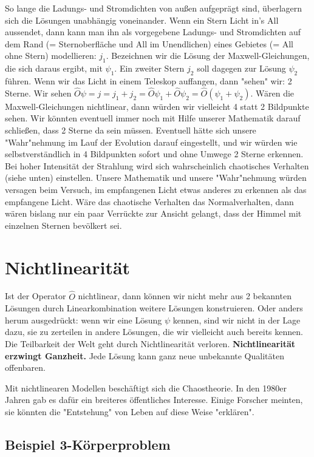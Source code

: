 \documentclass[12pt]{book}
\begin{document}
So lange die Ladungs- und Stromdichten von außen aufgeprägt sind, überlagern sich die Lösungen unabhängig voneinander. Wenn ein Stern Licht in's All aussendet, dann kann man ihn als vorgegebene Ladungs- und Stromdichten auf dem Rand (= Sternoberfläche und All im Unendlichen) eines Gebietes (= All ohne Stern) modellieren: $j_1$. Bezeichnen wir die Lösung der Maxwell-Gleichungen, die sich daraus ergibt, mit $\psi_1$. Ein zweiter Stern $j_2$ soll dagegen zur Lösung $\psi_2$ führen. Wenn wir das Licht in einem Teleskop auffangen, dann "sehen" wir: 2 Sterne. Wir sehen $\hat{O}\psi=j=j_1+j_2=\hat{O}\psi_1+\hat{O}\psi_2=\hat{O}(\psi_1+\psi_2)$. Wären die Maxwell-Gleichungen nichtlinear, dann würden wir vielleicht 4 statt 2 Bildpunkte sehen. Wir könnten eventuell immer noch mit Hilfe unserer Mathematik darauf schließen, dass 2 Sterne da sein müssen. Eventuell hätte sich unsere "Wahr"nehmung im Lauf der Evolution darauf eingestellt, und wir würden wie selbstverständlich in 4 Bildpunkten sofort und ohne Umwege 2 Sterne erkennen. Bei hoher Intensität der Strahlung wird sich wahrscheinlich chaotisches Verhalten (siehe unten) einstellen. Unsere Mathematik und unsere "Wahr"nehmung würden versagen beim Versuch, im empfangenen Licht etwas anderes zu erkennen als das empfangene Licht. Wäre das chaotische Verhalten das Normalverhalten, dann wären bislang nur ein paar Verrückte zur Ansicht gelangt, dass der Himmel mit einzelnen Sternen bevölkert sei.

\section{Nichtlinearität}

Ist der Operator $\hat{O}$ nichtlinear, dann können wir nicht mehr aus 2 bekannten Lösungen durch Linearkombination weitere Lösungen konstruieren. Oder anders herum ausgedrückt: wenn wir eine Lösung $\psi$ kennen, sind wir nicht in der Lage dazu, sie zu zerteilen in andere Lösungen, die wir vielleicht auch bereits kennen. Die Teilbarkeit der Welt geht durch Nichtlinearität verloren. \textbf{Nichtlinearität erzwingt Ganzheit.} Jede Lösung kann ganz neue unbekannte Qualitäten offenbaren.

Mit nichtlinearen Modellen beschäftigt sich die Chaostheorie. In den 1980er Jahren gab es dafür ein breiteres öffentliches Interesse. Einige Forscher meinten, sie könnten die "Entstehung" von Leben auf diese Weise "erklären". 

\subsection{Beispiel 3-Körperproblem}
\end{document}
